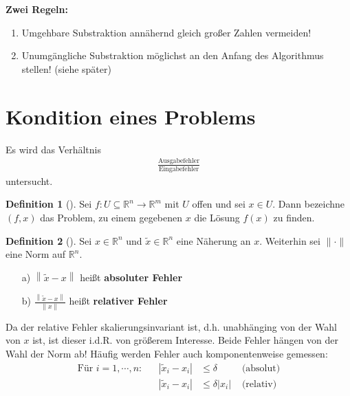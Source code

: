 \documentclass[ngerman,fontsize=11pt, paper=a4, parskip=half, titlepage=true, toc=bib]{scrbook}
\theoremstyle{definition}
\newtheorem{Def}{Definition}[section]		%
\theoremstyle{plain}
\newcommand{\R}{\mathds{R}}
\newcommand{\nn}[1]{\left\| #1 \right\|}
\newcommand{\sectione}[1]{ \setcounter{equation}{0}\section{#1}}
\newcommand{\subsectione}[1]{\addtocounter{Def}{1}\subsection{#1}}
\newenvironment{Defe}[1][]{ %
  \begin{Def}[#1]
  }
  {
  \end{Def}
  \addtocounter{subsection}{1}
}
\begin{document}
\textbf{Zwei Regeln:}
\begin{enumerate}[1)]
\item Umgehbare Substraktion annähernd gleich großer Zahlen vermeiden!
\item Unumgängliche Substraktion möglichst an den Anfang des Algorithmus stellen! (siehe später)
\end{enumerate}

\sectione{Kondition eines Problems} \label{3.2}
Es wird das Verhältnis 
\begin{gather*}
  \frac{\text{Ausgabefehler}}{\text{Eingabefehler}}
\end{gather*}
untersucht.

\begin{Defe}
  \label{3.2.1} 
  Sei $f: U \subseteq \R^n \rightarrow \R^m$ mit $U$ offen und sei $x\in U$.
  Dann bezeichne $(f, x)$ das Problem, zu einem gegebenen $x$ die Lösung $f(x)$ zu finden.
\end{Defe}

\begin{Defe}
  \label{3.2.2} 
  Sei $x\in\R^n$ und $\widetilde{x} \in \R^n$ eine Näherung an $x$. Weiterhin sei $\|\cdot\|$ eine Norm auf $\R^n$.
  \begin{itemize}
  \item[a)] $\nn{\widetilde{x} - x}$ heißt \textbf{absoluter Fehler} 
  \item[b)] $\frac{\nn{\widetilde{x} - x}}{\nn{x}}$ heißt \textbf{relativer Fehler}
  \end{itemize}
  Da der relative Fehler skalierungsinvariant ist, d.h. unabhänging von der  Wahl von $x$ ist, ist dieser i.d.R. von größerem Interesse.
  Beide Fehler hängen von der Wahl der Norm ab!
  Häufig werden Fehler auch komponentenweise gemessen:
  \begin{align*}
    \text{Für } i=1,\cdots , n : && |\widetilde{x}_i - x_i | & \leq \delta & \text{ (absolut)} \\
                                 && |\widetilde{x}_i - x_i | &\leq \delta |x_i| & \text{ (relativ)}
  \end{align*}
\end{Defe}
\end{document}
